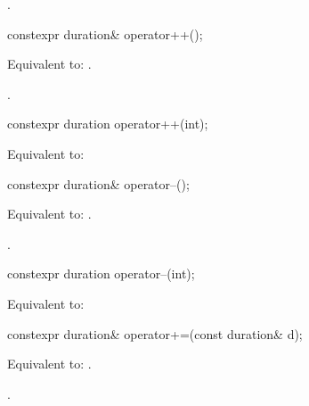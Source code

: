 \begin{itemdescr}
\pnum
\returns
{}.
\end{itemdescr}

%
\begin{itemdecl}
constexpr duration& operator++();
\end{itemdecl}

\begin{itemdescr}
\pnum
\effects
Equivalent to: .

\pnum
\returns
{}.
\end{itemdescr}

%
\begin{itemdecl}
constexpr duration operator++(int);
\end{itemdecl}

\begin{itemdescr}
\pnum
\effects
Equivalent to: 
\end{itemdescr}

%
\begin{itemdecl}
constexpr duration& operator--();
\end{itemdecl}

\begin{itemdescr}
\pnum
\effects
Equivalent to: .

\pnum
\returns
{}.
\end{itemdescr}

%
\begin{itemdecl}
constexpr duration operator--(int);
\end{itemdecl}

\begin{itemdescr}
\pnum
\effects
Equivalent to: 
\end{itemdescr}

%
\begin{itemdecl}
constexpr duration& operator+=(const duration& d);
\end{itemdecl}

\begin{itemdescr}
\pnum
\effects
Equivalent to: .

\pnum
\returns
{}.
\end{itemdescr}


